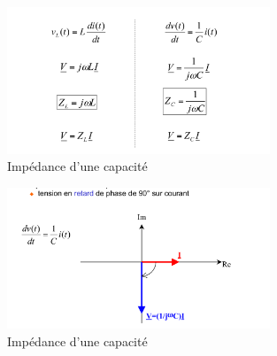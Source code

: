 \documentclass[a4paper]{article}
\begin{document}
            \begin{figure}[H]
                \begin{center}
                    \includegraphics[width=0.7\textwidth]{fig/2_impedance_C1.png}
                    \caption{Impédance d'une capacité}
                    \label{fig:2_superposition}
                \end{center}
            \end{figure}
            
            \begin{figure}[H]
                \begin{center}
                    \includegraphics[width=0.7\textwidth]{fig/2_impedance_C2.png}
                    \caption{Impédance d'une capacité}
                    \label{fig:2_superposition}
                \end{center}
            \end{figure}
\end{document}
